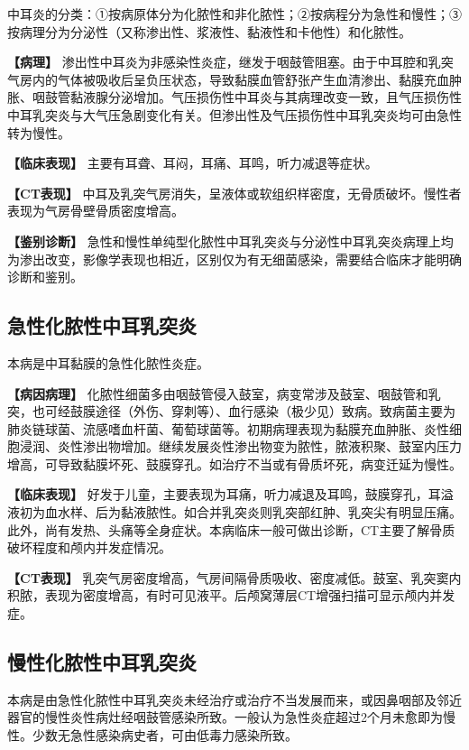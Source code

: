 中耳炎的分类：①按病原体分为化脓性和非化脓性；②按病程分为急性和慢性；③按病理分为分泌性（又称渗出性、浆液性、黏液性和卡他性）和化脓性。

\textbf{【病理】}
渗出性中耳炎为非感染性炎症，继发于咽鼓管阻塞。由于中耳腔和乳突气房内的气体被吸收后呈负压状态，导致黏膜血管舒张产生血清渗出、黏膜充血肿胀、咽鼓管黏液腺分泌增加。气压损伤性中耳炎与其病理改变一致，且气压损伤性中耳乳突炎与大气压急剧变化有关。但渗出性及气压损伤性中耳乳突炎均可由急性转为慢性。

\textbf{【临床表现】} 主要有耳聋、耳闷，耳痛、耳鸣，听力减退等症状。

\textbf{【CT表现】}
中耳及乳突气房消失，呈液体或软组织样密度，无骨质破坏。慢性者表现为气房骨壁骨质密度增高。

\textbf{【鉴别诊断】}
急性和慢性单纯型化脓性中耳乳突炎与分泌性中耳乳突炎病理上均为渗出改变，影像学表现也相近，区别仅为有无细菌感染，需要结合临床才能明确诊断和鉴别。

\subsection{急性化脓性中耳乳突炎}

本病是中耳黏膜的急性化脓性炎症。

\textbf{【病因病理】}
化脓性细菌多由咽鼓管侵入鼓室，病变常涉及鼓室、咽鼓管和乳突，也可经鼓膜途径（外伤、穿刺等）、血行感染（极少见）致病。致病菌主要为肺炎链球菌、流感嗜血杆菌、葡萄球菌等。初期病理表现为黏膜充血肿胀、炎性细胞浸润、炎性渗出物增加。继续发展炎性渗出物变为脓性，脓液积聚、鼓室内压力增高，可导致黏膜坏死、鼓膜穿孔。如治疗不当或有骨质坏死，病变迁延为慢性。

\textbf{【临床表现】}
好发于儿童，主要表现为耳痛，听力减退及耳鸣，鼓膜穿孔，耳溢液初为血水样、后为黏液脓性。如合并乳突炎则乳突部红肿、乳突尖有明显压痛。此外，尚有发热、头痛等全身症状。本病临床一般可做出诊断，CT主要了解骨质破坏程度和颅内并发症情况。

\textbf{【CT表现】}
乳突气房密度增高，气房间隔骨质吸收、密度减低。鼓室、乳突窦内积脓，表现为密度增高，有时可见液平。后颅窝薄层CT增强扫描可显示颅内并发症。

\subsection{慢性化脓性中耳乳突炎}

本病是由急性化脓性中耳乳突炎未经治疗或治疗不当发展而来，或因鼻咽部及邻近器官的慢性炎性病灶经咽鼓管感染所致。一般认为急性炎症超过2个月未愈即为慢性。少数无急性感染病史者，可由低毒力感染所致。


